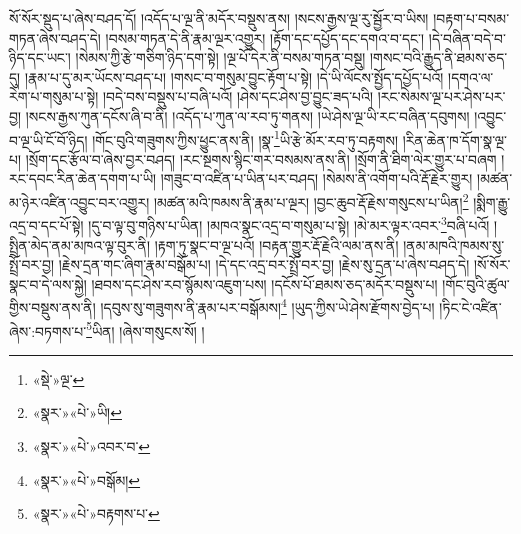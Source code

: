 སོ་སོར་སྡུད་པ་ཞེས་བཤད་དོ། །འདོད་པ་ལྔ་ནི་མདོར་བསྡུས་ནས། །སངས་རྒྱས་ལྔ་རུ་སྦྱོར་བ་ཡིས། །བརྟག་པ་བསམ་གཏན་ཞེས་བཤད་དེ། །བསམ་གཏན་དེ་ནི་རྣམ་ལྔར་འགྱུར། །རྟོག་དང་དཔྱོད་དང་དགའ་བ་དང་། །དེ་བཞིན་བདེ་བ་ཉིད་དང་ཡང་། །སེམས་ཀྱི་རྩེ་གཅིག་ཉིད་དག་སྟེ། །ལྔ་པོ་དེར་ནི་བསམ་གཏན་བསྡུ། །གསང་བའི་རྒྱུད་ནི་ཐམས་ཅད་དུ། །རྣམ་པ་དུ་མར་ཡོངས་བཤད་པ། །གསང་བ་གསུམ་བྱུང་རྟོག་པ་སྟེ། །དེ་ཡི་ལོངས་སྤྱོད་དཔྱོད་པའོ། །དགའ་ལ་རེག་པ་གསུམ་པ་སྟེ། །བདེ་བས་བསྡུས་པ་བཞི་པའོ། །ཤེས་དང་ཤེས་བྱ་བྱུང་ཟད་པའི། །རང་སེམས་ལྔ་པར་ཤེས་པར་བྱ། །སངས་རྒྱས་ཀུན་དངོས་ཞི་བ་ནི། །འདོད་པ་ཀུན་ལ་རབ་ཏུ་གནས། །ཡེ་ཤེས་ལྔ་ཡི་རང་བཞིན་དབུགས། །འབྱུང་བ་ལྔ་ཡི་ངོ་བོ་ཉིད། །གོང་བུའི་གཟུགས་ཀྱིས་ཕྱུང་ནས་ནི། །སྣ་\footnote{«སྡེ་»ལྔ་}ཡི་རྩེ་མོར་རབ་ཏུ་བརྟགས། །རིན་ཆེན་ཁ་དོག་སྣ་ལྔ་པ། །སྲོག་དང་རྩོལ་བ་ཞེས་བྱར་བཤད། །རང་སྔགས་སྙིང་གར་བསམས་ནས་ནི། །སྲོག་ནི་ཐིག་ལེར་གྱུར་པ་བཞག །རང་དབང་རིན་ཆེན་དགག་པ་ཡི། །གཟུང་བ་འཛིན་པ་ཡིན་པར་བཤད། །སེམས་ནི་འགོག་པའི་རྡོ་རྗེར་གྱུར། །མཚན་མ་ཉེར་འཛིན་འབྱུང་བར་འགྱུར། །མཚན་མའི་ཁམས་ནི་རྣམ་པ་ལྔར། །བྱང་ཆུབ་རྡོ་རྗེས་གསུངས་པ་ཡིན།\footnote{«སྣར་»«པེ་»ཡི།} །སྨིག་རྒྱུ་འདྲ་བ་དང་པོ་སྟེ། །དུ་བ་ལྟ་བུ་གཉིས་པ་ཡིན། །མཁའ་སྣང་འདྲ་བ་གསུམ་པ་སྟེ། །མེ་མར་ལྟར་འབར་\footnote{«སྣར་»«པེ་»འབར་བ་}བཞི་པའོ། །སྤྲིན་མེད་ནམ་མཁའ་ལྟ་བུར་ནི། །རྟག་ཏུ་སྣང་བ་ལྔ་པའོ། །བརྟན་གྱུར་རྡོ་རྗེའི་ལམ་ནས་ནི། །ནམ་མཁའི་ཁམས་སུ་སྤྲོ་བར་བྱ། །རྗེས་དྲན་གང་ཞིག་རྣམ་བསྒོམ་པ། །དེ་དང་འདྲ་བར་སྤྲོ་བར་བྱ། །རྗེས་སུ་དྲན་པ་ཞེས་བཤད་དེ། །སོ་སོར་སྣང་བ་དེ་ལས་སྐྱེ། །ཐབས་དང་ཤེས་རབ་སྙོམས་འཇུག་པས། །དངོས་པོ་ཐམས་ཅད་མདོར་བསྡུས་པ། །གོང་བུའི་ཚུལ་གྱིས་བསྡུས་ནས་ནི། །དབུས་སུ་གཟུགས་ནི་རྣམ་པར་བསྒོམས།\footnote{«སྣར་»«པེ་»བསྒོམ།} །ཡུད་ཀྱིས་ཡེ་ཤེས་རྫོགས་བྱེད་པ། །ཏིང་ངེ་འཛིན་ཞེས་:བཏགས་པ་\footnote{«སྣར་»«པེ་»བརྟགས་པ་}ཡིན། །ཞེས་གསུངས་སོ། །
